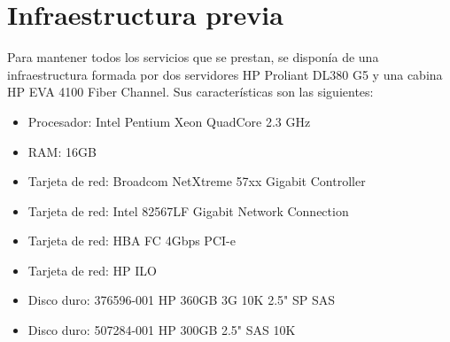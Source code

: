 \documentclass[12pt,a4paper,titlepage,twoside]{report}
\begin{document}
\section{Infraestructura previa}
Para mantener todos los servicios que se prestan, se disponía de una infraestructura formada por dos servidores HP Proliant DL380 G5 y una cabina HP EVA 4100 Fiber Channel. Sus características son las siguientes:
\begin{itemize}
    \item Procesador: Intel Pentium Xeon QuadCore 2.3 GHz
    \item RAM: 16GB
    \item Tarjeta de red: Broadcom NetXtreme 57xx Gigabit Controller
    \item Tarjeta de red: Intel 82567LF Gigabit Network Connection
    \item Tarjeta de red: HBA FC 4Gbps PCI-e
    \item Tarjeta de red: HP ILO
    \item Disco duro: 376596-001 HP 360GB 3G 10K 2.5" SP SAS
    \item Disco duro: 507284-001 HP 300GB 2.5" SAS 10K
\end{itemize}
\end{document}
